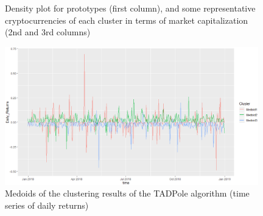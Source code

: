 \documentclass{bmcart}
\begin{document}
\begin{backmatter}
\begin{figure}[h!]
	\caption{Density plot for prototypes (first column), and some representative cryptocurrencies of each cluster in terms of market capitalization  (2nd and 3rd columns) }
	\label{fig:CentroidHist}
\end{figure} 


\begin{figure}[h!]
	\centering
	\includegraphics[width=110mm]{TADPoleMedoidsB.eps} 
	\caption{Medoids of the clustering results of the TADPole algorithm (time series of daily returns)}
	\label{fig:CentroidTADPole}
\end{figure}


\end{backmatter}
\end{document}
